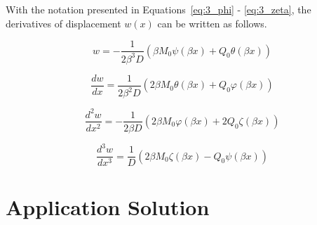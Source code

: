 With the notation presented in Equations~\ref{eq:3_phi} - \ref{eq:3_zeta}, the derivatives of displacement $w(x)$ can be written as follows.

\begin{equation}
	\label{eq:3_w0}
	w = - \frac{1}{2 \beta^3 D} \left( \beta M_0 \psi(\beta x) + Q_0 \theta (\beta x) \right)
\end{equation}

\begin{equation}
	\label{eq:3_w1}
	\frac{dw}{dx} = \frac{1}{2 \beta^2 D} \left( 2 \beta M_0 \theta(\beta x) + Q_0 \varphi(\beta x) \right)	
\end{equation}

\begin{equation}
	\label{eq:3_w2}
	\frac{d^2w}{dx^2} = - \frac{1}{2 \beta D} \left( 2 \beta M_0 \varphi(\beta x) + 2 Q_0 \zeta(\beta x) \right)
\end{equation}

\begin{equation}
	\label{eq:3_w3}
	\frac{d^3w}{dx^3} = \frac{1}{D} \left( 2 \beta M_0 \zeta(\beta x) - Q_0 \psi(\beta x) \right)
\end{equation}


\section{Application Solution}
